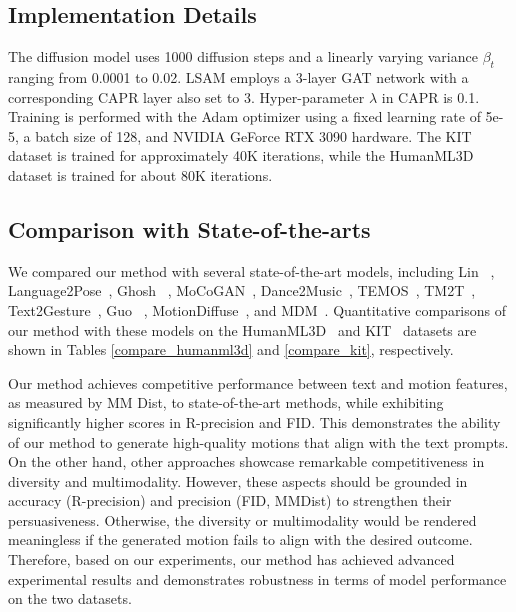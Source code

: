 \documentclass[10pt,twocolumn,letterpaper]{article}
\begin{document}
\subsection{Implementation Details}
\label{sec:Implementation Details}

The diffusion model uses 1000 diffusion steps and a linearly varying variance $\beta_t$ ranging from 0.0001 to 0.02. LSAM employs a 3-layer GAT network with a corresponding CAPR layer also set to 3. Hyper-parameter $\lambda$ in CAPR is 0.1. Training is performed with the Adam optimizer using a fixed learning rate of 5e-5, a batch size of 128, and NVIDIA GeForce RTX 3090 hardware. The KIT dataset is trained for approximately 40K iterations, while the HumanML3D dataset is trained for about 80K iterations.






\subsection{Comparison with State-of-the-arts}
\label{sec:Comparison with State-of-the-arts}

We compared our method with several state-of-the-art models, including Lin \etal~\cite{lin:vigil18}, Language2Pose~\cite{ahuja2019language2pose}, Ghosh \etal~\cite{ghosh2021synthesis}, MoCoGAN~\cite{tulyakov2018mocogan}, Dance2Music~\cite{lee2019dancing}, TEMOS~\cite{petrovich2022temos}, TM2T~\cite{guo2022tm2t}, Text2Gesture~\cite{bhattacharya2021text2gestures}, Guo \etal~\cite{guo2022generating}, MotionDiffuse~\cite{zhang2022motiondiffuse}, and MDM~\cite{tevet2022human}. Quantitative comparisons of our method with these models on the HumanML3D~\cite{guo2022generating} and KIT~\cite{plappert2016kit} datasets are shown in Tables \ref{compare_humanml3d} and \ref{compare_kit}, respectively. 



Our method achieves competitive performance between text and motion features, as measured by MM Dist, to state-of-the-art methods, while exhibiting significantly higher scores in R-precision and FID. This demonstrates the ability of our method to generate high-quality motions that align with the text prompts. On the other hand, other approaches showcase remarkable competitiveness in diversity and multimodality. However, these aspects should be grounded in accuracy (R-precision) and precision (FID, MMDist) to strengthen their persuasiveness. Otherwise, the diversity or multimodality would be rendered meaningless if the generated motion fails to align with the desired outcome. Therefore, based on our experiments, our method has achieved advanced experimental results and demonstrates robustness in terms of model performance on the two datasets. 
\end{document}

